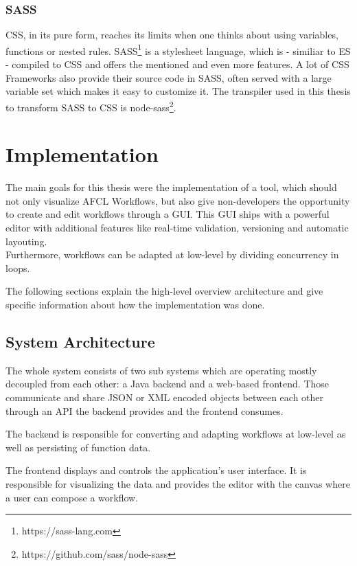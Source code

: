 \documentclass[a4paper,12pt,pdftex,halfparskip,cleardoubleempty,bibtotoc,liststotoc]{scrbook}
\begin{document}
\subsection{SASS}

CSS, in its pure form, reaches its limits when one thinks about using variables, functions or nested rules. SASS\footnote{https://sass-lang.com} is a stylesheet language, which is - similiar to ES - compiled to CSS and offers the mentioned and even more features.
A lot of CSS Frameworks also provide their source code in SASS, often served with a large variable set which makes it easy to customize it. The transpiler used in this thesis to transform SASS to CSS is node-sass\footnote{https://github.com/sass/node-sass}.


\chapter{Implementation}


The main goals for this thesis were the implementation of a tool, which should not only visualize AFCL Workflows, but also give non-developers the opportunity to create and edit workflows through a GUI. This GUI ships with a powerful editor with additional features like real-time validation, versioning and automatic layouting.\\
Furthermore, workflows can be adapted at low-level by dividing concurrency in loops.

The following sections explain the high-level overview architecture and give specific information about how the implementation was done. 

\section{System Architecture}

The whole system consists of two sub systems which are operating mostly decoupled from each other: a Java backend and a web-based frontend. Those communicate and share JSON or XML encoded objects between each other through an API the backend provides and the frontend consumes.

The backend is responsible for converting and adapting workflows at low-level as well as persisting of function data.

The frontend displays and controls the application's user interface. It is responsible for visualizing the data and provides the editor with the canvas where a user can compose a workflow.
\end{document}
